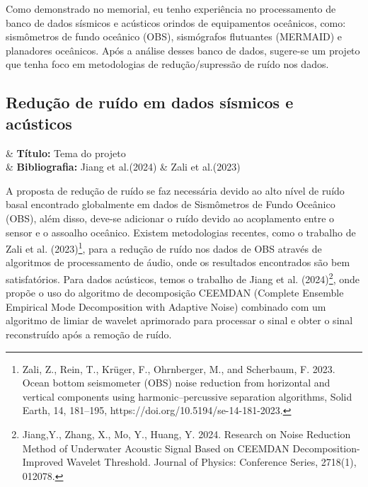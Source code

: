 \documentclass[10pt,a4paper,oneside]{book}
\begin{document}
Como demonstrado no memorial, eu tenho experiência no processamento de banco de dados sísmicos e acústicos orindos de equipamentos oceânicos, como: sismômetros de fundo oceânico (OBS), sismógrafos flutuantes (MERMAID) e planadores oceânicos. Após a análise desses banco de dados, sugere-se um projeto que tenha foco em metodologias de redução/supressão de ruído nos dados.

\subsection{Redução de ruído em dados sísmicos e acústicos}

\begin{projectbox}[frametitle=\faProjectDiagram{}\quad Panorama do Projeto de pesquisa: Redução de ruído]
	\begin{datelist}
		\faTag & \textbf{Título:} Tema do projeto \\
		\faBook & \textbf{Bibliografia:}  Jiang et al.(2024) \& Zali et al.(2023)\\
	\end{datelist}
\end{projectbox}

\bigskip

A proposta de redução de ruído se faz necessária devido ao alto nível de ruído basal encontrado globalmente em dados de Sismômetros de Fundo Oceânico (OBS), além disso, deve-se adicionar o ruído devido ao acoplamento entre o sensor e o assoalho oceânico. Existem metodologias recentes, como o trabalho de Zali et al. (2023)\footnote{Zali, Z., Rein, T., Krüger, F., Ohrnberger, M., and Scherbaum, F. 2023. Ocean bottom seismometer (OBS) noise reduction from horizontal and vertical components using harmonic–percussive separation algorithms, Solid Earth, 14, 181–195, https://doi.org/10.5194/se-14-181-2023.}, para a redução de ruído nos dados de OBS através de algoritmos de processamento de áudio, onde os resultados encontrados são bem satisfatórios. Para dados acústicos, temos o trabalho de Jiang et al. (2024)\footnote{Jiang,Y., Zhang, X., Mo, Y., Huang, Y. 2024. Research on Noise Reduction Method of Underwater Acoustic Signal Based on CEEMDAN Decomposition-Improved Wavelet Threshold. Journal of Physics: Conference Series, 2718(1), 012078.}, onde propõe o uso do algoritmo de decomposição CEEMDAN (Complete Ensemble Empirical Mode Decomposition with Adaptive Noise) combinado com um algoritmo de limiar de wavelet aprimorado para processar o sinal e obter o sinal reconstruído após a remoção de ruído.
\end{document}
